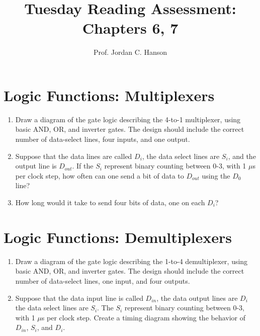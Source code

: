 \documentclass{article}
\begin{document}
\twocolumn

\title{Tuesday Reading Assessment: Chapters 6, 7}
\author{Prof. Jordan C. Hanson}

\maketitle

\section{Logic Functions: Multiplexers}

\begin{enumerate}
\item Draw a diagram of the gate logic describing the 4-to-1 multiplexer, using basic AND, OR, and inverter gates. The design should include the correct number of data-select lines, four inputs, and one output. \\ \vspace{5cm}
\item Suppose that the data lines are called $D_i$, the data select lines are $S_i$, and the output line is $D_{out}$.  If the $S_i$ represent binary counting between 0-3, with 1 $\mu$s per clock step, how often can one send a bit of data to $D_{out}$ using the $D_0$ line? \\ \vspace{2cm} 
\item How long would it take to send four bits of data, one on each $D_i$? \\ \vspace{2cm}
\end{enumerate}

\section{Logic Functions: Demultiplexers}

\begin{enumerate}
\item Draw a diagram of the gate logic describing the 1-to-4 demultiplexer, using basic AND, OR, and inverter gates. The design should include the correct number of data-select lines, one input, and four outputs. \\ \vspace{5cm}
\item Suppose that the data input line is called $D_{in}$, the data output lines are $D_i$ the data select lines are $S_i$.  The $S_i$ represent binary counting between 0-3, with 1 $\mu$s per clock step.  Create a timing diagram showing the behavior of $D_{in}$, $S_i$, and $D_i$.  \\ \vspace{4cm}
\end{enumerate}
\end{document}
